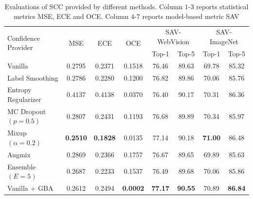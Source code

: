 \documentclass[runningheads]{llncs}
\begin{document}
\begin{table}[t]
	\centering
	\caption{Evaluations of SCC provided by different methods. Column $1$-$3$ reports statistical metrics MSE, ECE and OCE. Column $4$-$7$ reports model-based metric SAV}
	\smallskip
	\begin{tabular}{lccc@{\hskip 5pt}cccc}
		\toprule
		\multirow{2}{*}{Confidence Provider} & \multicolumn{1}{c}{\multirow{2}{*}{MSE}} & \multicolumn{1}{c}{\multirow{2}{*}{ECE}} & \multicolumn{1}{c}{\multirow{2}{*}{OCE}} & \multicolumn{2}{c}{SAV-WebVision} & \multicolumn{2}{c}{SAV-ImageNet}\\
		& \multicolumn{1}{c}{} & \multicolumn{1}{c}{} & \multicolumn{1}{c}{} & \multicolumn{1}{c}{Top-1} & \multicolumn{1}{c}{Top-5} & \multicolumn{1}{c}{Top-1} & \multicolumn{1}{c}{Top-5}\\ 
		\midrule
		Vanilla 						& 0.2795 & 0.2371 & 0.1518 & 76.46 & 89.63 & 69.78 & 85.32 \\ 
		Label Smoothing  		 & 0.2786 & 0.2280 & 0.1200 & 76.82 & 89.86 & 70.06 & 85.76 \\ 
		Entropy Regularizer 	& 0.4137 & 0.4138 & 0.0370 & 76.40 & 90.17 & 70.31 & 86.36 \\ 
		MC Dropout $(p=0.5)$ & 0.2807 & 0.2431 & 0.1193 & 76.68 & 89.89 & 70.34 & 85.97 \\ 
		Mixup $(\alpha=0.2)$  & \textbf{0.2510} & \textbf{0.1828} & 0.0135 & 77.14 & 90.18 & \textbf{71.00} & 86.48 \\
		Augmix	  					& 0.2869 & 0.2366 & 0.1757  & 76.67 & 89.65 & 69.89 & 85.63  \\ 
		Ensemble $(E=5)$ 	  & 0.2687 & 0.2233 & 0.1537  & 76.49 & 89.68 & 70.06 & 85.86  \\ 
		Vanilla + GBA 	  & 0.2612 & 0.2494 & \textbf{0.0002}  & \textbf{77.17} & \textbf{90.55} & 70.89 & \textbf{86.84} \\ 
		\bottomrule
	\end{tabular}
	\label{tab:comparison}
\end{table}
\end{document}

